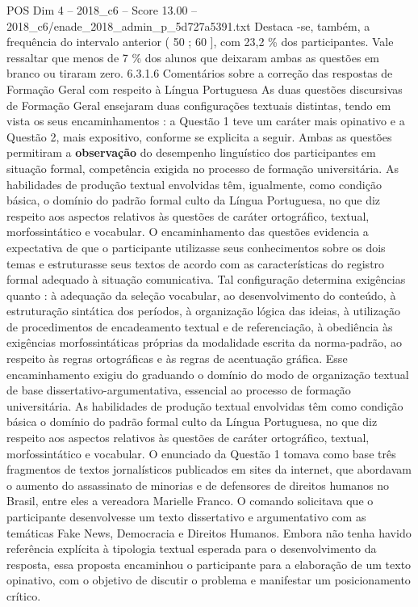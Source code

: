 \begin{textsample}{POS Dim 4 – 2018\_c6 – Score 13.00 – 2018\_c6/enade\_2018\_admin\_p\_5d727a5391.txt}
Destaca -se, também, a frequência do intervalo anterior ( 50 ; 60 ], com 23,2 \% dos participantes.
Vale ressaltar que menos de 7 \% dos alunos que deixaram ambas as questões em branco ou tiraram zero. 6.3.1.6 Comentários sobre a correção das respostas de Formação Geral com respeito à Língua Portuguesa As duas questões discursivas de Formação Geral ensejaram duas configurações textuais distintas, tendo em vista os seus encaminhamentos : a Questão 1 teve um caráter mais opinativo e a Questão 2, mais expositivo, conforme se explicita a seguir.
Ambas as questões permitiram a \textbf{observação} do desempenho linguístico dos participantes em situação formal, competência exigida no processo de formação universitária.
As habilidades de produção textual envolvidas têm, igualmente, como condição básica, o domínio do padrão formal culto da Língua Portuguesa, no que diz respeito aos aspectos relativos às questões de caráter ortográfico, textual, morfossintático e vocabular.
O encaminhamento das questões evidencia a expectativa de que o participante utilizasse seus conhecimentos sobre os dois temas e estruturasse seus textos de acordo com as características do registro formal adequado à situação comunicativa.
Tal configuração determina exigências quanto : à adequação da seleção vocabular, ao desenvolvimento do conteúdo, à estruturação sintática dos períodos, à organização lógica das ideias, à utilização de procedimentos de encadeamento textual e de referenciação, à obediência às exigências morfossintáticas próprias da modalidade escrita da norma-padrão, ao respeito às regras ortográficas e às regras de acentuação gráfica.
Esse encaminhamento exigiu do graduando o domínio do modo de organização textual de base dissertativo-argumentativa, essencial ao processo de formação universitária.
As habilidades de produção textual envolvidas têm como condição básica o domínio do padrão formal culto da Língua Portuguesa, no que diz respeito aos aspectos relativos às questões de caráter ortográfico, textual, morfossintático e vocabular.
O enunciado da Questão 1 tomava como base três fragmentos de textos jornalísticos publicados em sites da internet, que abordavam o aumento do assassinato de minorias e de defensores de direitos humanos no Brasil, entre eles a vereadora Marielle Franco.
O comando solicitava que o participante desenvolvesse um texto dissertativo e argumentativo com as temáticas Fake News, Democracia e Direitos Humanos.
Embora não tenha havido referência explícita à tipologia textual esperada para o desenvolvimento da resposta, essa proposta encaminhou o participante para a elaboração de um texto opinativo, com o objetivo de discutir o problema e manifestar um posicionamento crítico.

\end{textsample}
